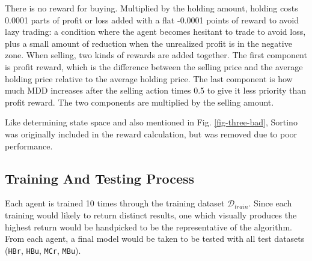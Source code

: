 There is no reward for buying. Multiplied by the holding amount, holding costs 0.0001 parts of profit or loss added with a flat -0.0001 points of reward to avoid lazy trading: a condition where the agent becomes hesitant to trade to avoid loss, plus a small amount of reduction when the unrealized profit is in the negative zone. When selling, two kinds of rewards are added together. The first component is profit reward, which is the difference between the selling price and the average holding price relative to the average holding price. The last component is how much MDD increases after the selling action times 0.5 to give it less priority than profit reward. The two components are multiplied by the selling amount.

Like determining state space and also mentioned in Fig. \ref{fig-three-bad}, Sortino was originally included in the reward calculation, but was removed due to poor performance.

\subsection{Training And Testing Process}
Each agent is trained 10 times through the training dataset $\mathcal{D}_{train}$. Since each training would likely to return distinct results, one which visually produces the highest return would be handpicked to be the representative of the algorithm. From each agent, a final model would be taken to be tested with all test datasets (\texttt{HBr}, \texttt{HBu}, \texttt{MCr}, \texttt{MBu}).
